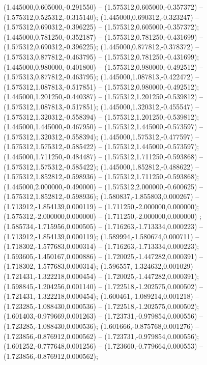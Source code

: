  (1.445000,0.605000,-0.291550) -- (1.575312,0.605000,-0.357372) -- (1.575312,0.525312,-0.315140);
 (1.445000,0.690312,-0.323247) -- (1.575312,0.690312,-0.396225) -- (1.575312,0.605000,-0.357372);
 (1.445000,0.781250,-0.352187) -- (1.575312,0.781250,-0.431699) -- (1.575312,0.690312,-0.396225);
 (1.445000,0.877812,-0.378372) -- (1.575313,0.877812,-0.463795) -- (1.575312,0.781250,-0.431699);
 (1.445000,0.980000,-0.401800) -- (1.575312,0.980000,-0.492512) -- (1.575313,0.877812,-0.463795);
 (1.445000,1.087813,-0.422472) -- (1.575312,1.087813,-0.517851) -- (1.575312,0.980000,-0.492512);
 (1.445000,1.201250,-0.440387) -- (1.575312,1.201250,-0.539812) -- (1.575312,1.087813,-0.517851);
 (1.445000,1.320312,-0.455547) -- (1.575312,1.320312,-0.558394) -- (1.575312,1.201250,-0.539812);
 (1.445000,1.445000,-0.467950) -- (1.575312,1.445000,-0.573597) -- (1.575312,1.320312,-0.558394);
 (1.445000,1.575312,-0.477597) -- (1.575312,1.575312,-0.585422) -- (1.575312,1.445000,-0.573597);
 (1.445000,1.711250,-0.484487) -- (1.575312,1.711250,-0.593868) -- (1.575312,1.575312,-0.585422);
 (1.445000,1.852812,-0.488622) -- (1.575312,1.852812,-0.598936) -- (1.575312,1.711250,-0.593868);
 (1.445000,2.000000,-0.490000) -- (1.575312,2.000000,-0.600625) -- (1.575312,1.852812,-0.598936);
 (1.580837,-1.855803,0.000267) -- (1.713912,-1.854139,0.000119) -- (1.711250,-2.000000,0.000000);
 (1.575312,-2.000000,0.000000) -- (1.711250,-2.000000,0.000000) ;
 (1.585734,-1.715956,0.000505) -- (1.716263,-1.713334,0.000223) -- (1.713912,-1.854139,0.000119);
 (1.589994,-1.580674,0.000711) -- (1.718302,-1.577683,0.000314) -- (1.716263,-1.713334,0.000223);
 (1.593605,-1.450167,0.000886) -- (1.720025,-1.447282,0.000391) -- (1.718302,-1.577683,0.000314);
 (1.596557,-1.324632,0.001029) -- (1.721431,-1.322218,0.000454) -- (1.720025,-1.447282,0.000391);
 (1.598845,-1.204256,0.001140) -- (1.722518,-1.202575,0.000502) -- (1.721431,-1.322218,0.000454);
 (1.600461,-1.089214,0.001218) -- (1.723285,-1.088430,0.000536) -- (1.722518,-1.202575,0.000502);
 (1.601403,-0.979669,0.001263) -- (1.723731,-0.979854,0.000556) -- (1.723285,-1.088430,0.000536);
 (1.601666,-0.875768,0.001276) -- (1.723856,-0.876912,0.000562) -- (1.723731,-0.979854,0.000556);
 (1.601252,-0.777648,0.001256) -- (1.723660,-0.779664,0.000553) -- (1.723856,-0.876912,0.000562);
